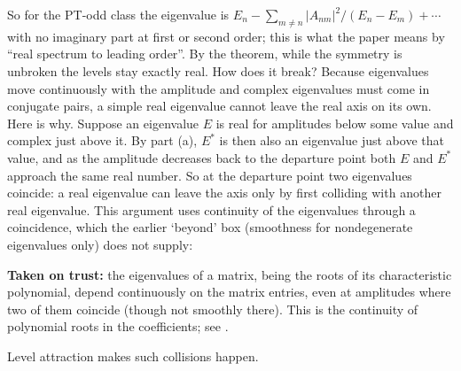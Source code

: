 So for the PT-odd class the eigenvalue is $E_n-\sum_{m\ne n}|A_{nm}|^2/(E_n-E_m)+\cdots$ with no imaginary part at first or second order; this is what the paper means by ``real spectrum to leading order''. By the theorem, while the symmetry is unbroken the levels stay exactly real. How does it break? Because eigenvalues move continuously with the amplitude and complex eigenvalues must come in conjugate pairs, a simple real eigenvalue cannot leave the real axis on its own. Here is why. Suppose an eigenvalue $E$ is real for amplitudes below some value and complex just above it. By part (a), $E^*$ is then also an eigenvalue just above that value, and as the amplitude decreases back to the departure point both $E$ and $E^*$ approach the same real number. So at the departure point two eigenvalues coincide: a real eigenvalue can leave the axis only by first colliding with another real eigenvalue. This argument uses continuity of the eigenvalues through a coincidence, which the earlier `beyond' box (smoothness for nondegenerate eigenvalues only) does not supply:
\begin{beyond}
\textbf{Taken on trust:} the eigenvalues of a matrix, being the roots of its characteristic polynomial, depend continuously on the matrix entries, even at amplitudes where two of them coincide (though not smoothly there). This is the continuity of polynomial roots in the coefficients; see \cite{trefethen}.
\end{beyond}
Level attraction makes such collisions happen.

